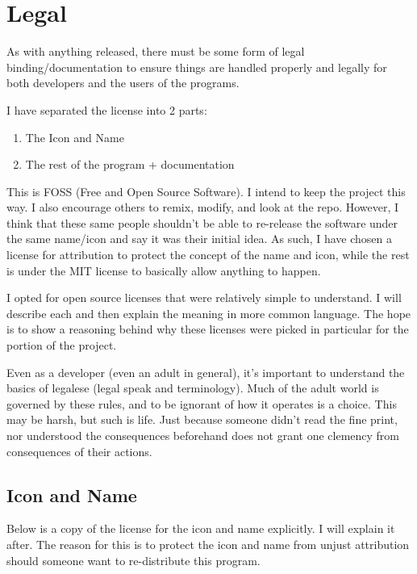 \section{Legal}

As with anything released, there must be some form of legal
binding/documentation to ensure things are handled properly and
legally for both developers and the users of the programs.

I have separated the license into 2 parts:

\begin{enumerate}
	\item The Icon and Name
	\item The rest of the program + documentation
\end{enumerate}

This is FOSS (Free and Open Source Software). I intend to keep the project
this way. I also encourage others to remix, modify, and
look at the repo. However, I think that these same people shouldn't be
able to re-release the software under the same name/icon and say it
was their initial idea. As such, I have chosen a license for
attribution to protect the concept of the name and icon, while the
rest is under the
MIT license to basically allow anything to happen.

I opted for open source licenses that were relatively simple
to understand. I will describe each and then explain the meaning in
more common language. The hope is to show a reasoning behind why
these licenses were picked in particular for the portion of the project.

Even as a developer (even an adult in general), it's important to
understand the basics of legalese (legal speak and terminology).
Much of the adult world is governed by these rules, and to be
ignorant of how it operates is a choice. This may be harsh, but such is
life. Just because someone didn't read the fine print, nor understood the
consequences beforehand does not grant one clemency from consequences
of their actions.

\subsection{Icon and Name}

Below is a copy of the license for the icon and name explicitly. I
will explain it after. The reason for this is to protect the icon and
name from unjust attribution should someone want to re-distribute this program.

